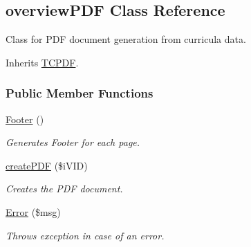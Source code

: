 \hypertarget{classoverview_p_d_f}{\subsection{overview\+P\+D\+F Class Reference}
\label{classoverview_p_d_f}
}


Class for P\+D\+F document generation from curricula data.  




Inherits \hyperlink{class_t_c_p_d_f}{T\+C\+P\+D\+F}.

\subsubsection*{Public Member Functions}
\begin{DoxyCompactItemize}
\item 
\hyperlink{classoverview_p_d_f_a2f39533ba0786237090683635ef01c49}{Footer} ()
\begin{DoxyCompactList}\small\item\em Generates Footer for each page. \end{DoxyCompactList}\item 
\hyperlink{classoverview_p_d_f_a30ddd92aaf87bca0825c149bd3a7d43f}{create\+P\+D\+F} (\$i\+V\+I\+D)
\begin{DoxyCompactList}\small\item\em Creates the P\+D\+F document. \end{DoxyCompactList}\item 
\hyperlink{classoverview_p_d_f_a5afab85a7aaf19395f9a0e86cae76928}{Error} (\$msg)
\begin{DoxyCompactList}\small\item\em Throws exception in case of an error. \end{DoxyCompactList}\end{DoxyCompactItemize}
